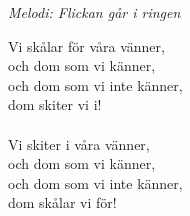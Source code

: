 {\footnotesize\textit{Melodi: Flickan går i ringen}}\par
\vspace{10pt}
Vi skålar för våra vänner,\\
och dom som vi känner,\\
och dom som vi inte känner,\\
dom skiter vi i!\\
\\
Vi skiter i våra vänner,\\
och dom som vi känner,\\
och dom som vi inte känner,\\
dom skålar vi för!
